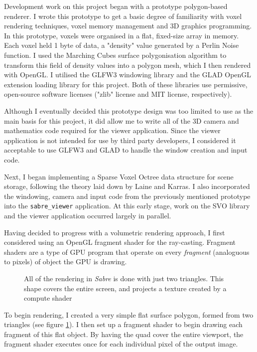 Development work on this project began with a prototype polygon-based renderer. I wrote this prototype to get a basic degree of familiarity with voxel rendering techniques, voxel memory management and 3D graphics programming. In this prototype, voxels were organised in a flat, fixed-size array in memory. Each voxel held 1 byte of data, a "density" value generated by a Perlin Noise function. I used the Marching Cubes surface polygonisation algorithm to transform this field of density values into a polygon mesh, which I then rendered with OpenGL. I utilised the GLFW3 \autocite{lowy2019glfw} windowing library and the GLAD \autocite{herberth2019glad} OpenGL extension loading library for this project. Both of these libraries use permissive, open-source software licenses ("zlib" license and MIT license, respectively).

Although I eventually decided this prototype design was too limited to use as the main basis for this project, it did allow me to write all of the 3D camera and mathematics code required for the viewer application. Since the viewer application is not intended for use by third party developers, I considered it acceptable to use GLFW3 and GLAD to handle the window creation and input code. 

Next, I began implementing a Sparse Voxel Octree data structure for scene storage, following the theory laid down by Laine and Karras. I also incorporated the windowing, camera and input code from the previously mentioned prototype into the \texttt{sabre\_viewer} application. At this early stage, work on the SVO library and the viewer application occurred largely in parallel.

Having decided to progress with a volumetric rendering approach, I first considered using an OpenGL fragment shader for the ray-casting. Fragment shaders are a type of GPU program that operate on every \textit{fragment} (analoguous to pixels) of object the GPU is drawing.

\begin{figure}[ht]
    \centering
    
    \caption{All of the rendering in \textit{Sabre} is done with just two triangles. This shape covers the entire screen, and projects a texture created by a compute shader}
    \label{fig:screen_quad}
\end{figure}

To begin rendering, I created a very simple flat surface polygon, formed from two triangles (see figure \ref{fig:screen_quad}). I then set up a fragment shader to begin drawing each fragment of this flat object. By having the quad cover the entire viewport, the fragment shader executes once for each individual pixel of the output image. 

